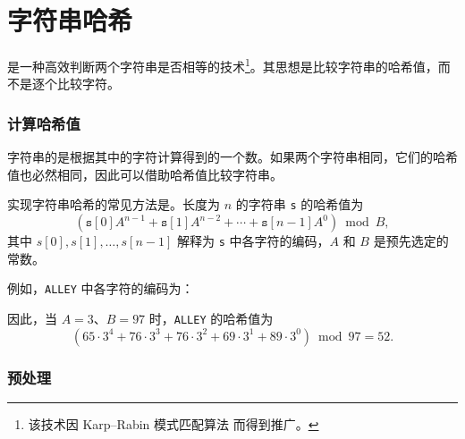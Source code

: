 \section{字符串哈希}


是一种高效判断两个字符串是否相等的技术\footnote{该技术因 Karp--Rabin 模式匹配算法 \cite{kar87} 而得到推广。}。其思想是比较字符串的哈希值，而不是逐个比较字符。

\subsubsection*{计算哈希值}


字符串的是根据其中的字符计算得到的一个数。如果两个字符串相同，它们的哈希值也必然相同，因此可以借助哈希值比较字符串。

实现字符串哈希的常见方法是。长度为 $n$ 的字符串 \texttt{s} 的哈希值为
\[(\texttt{s}[0] A^{n-1} + \texttt{s}[1] A^{n-2} + \cdots + \texttt{s}[n-1] A^0) \bmod B  ,\]
其中 $s[0],s[1],\ldots,s[n-1]$ 解释为 \texttt{s} 中各字符的编码，$A$ 和 $B$ 是预先选定的常数。

例如，\texttt{ALLEY} 中各字符的编码为：
\begin{center}
\end{center}

因此，当 $A=3$、$B=97$ 时，\texttt{ALLEY} 的哈希值为
\[(65 \cdot 3^4 + 76 \cdot 3^3 + 76 \cdot 3^2 + 69 \cdot 3^1 + 89 \cdot 3^0) \bmod 97 = 52.\]

\subsubsection*{预处理}

